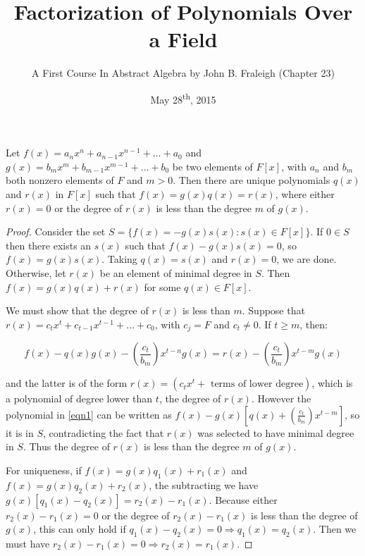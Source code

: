 \documentclass[a4paper,11pt]{article}
\title{Factorization of Polynomials Over a Field}
\author{A First Course In Abstract Algebra by John B. Fraleigh (Chapter 23)}
\date{May 28\textsuperscript{th}, 2015}
\begin{document}
\maketitle
{}

\begin{outline}

    Let \(f(x) = a_nx^n + a_{n-1}x^{n-1} + \ldots + a_0\)
    and \(g(x) = b_mx^m + b_{m-1}x^{m-1} + \ldots + b_0\) be two elements of \(F[x]\), with \(a_n\) and \(b_m\)
    both nonzero elements of \(F\) and \(m > 0\). Then there are unique polynomials \(q(x)\) and \(r(x)\) in \(F[x]\)
    such that \(f(x) = g(x)q(x) = r(x)\), where either \(r(x) = 0\) or the degree of \(r(x)\) is less than the degree
    \(m\) of \(g(x)\).
    
    \begin{proof}
      Consider the set \(S = \{f(x) =- g(x)s(x) : s(x) \in F[x]\}\). If \(0 \in S\) then there exists an \(s(x)\)
      such that \(f(x) - g(x)s(x) = 0\), so \(f(x) = g(x)s(x)\). Taking \(q(x) = s(x)\) and \(r(x) = 0\), we are done.
      Otherwise, let \(r(x)\) be an element of minimal degree in \(S\). Then \(f(x) = g(x)q(x) + r(x)\) for some \(q(x)
      \in F[x]\). 
      
      We must show that the degree of \(r(x)\) is less than \(m\). Suppose that \(r(x) = c_tx^t + c_{t-1}x^{t-1}
      + \ldots + c_0\), with \(c_j = F\) and \(c_t \neq 0\). If \(t \geq m\), then:
      
      \begin{equation}
      \label{eqn1}
      f(x) - q(x)g(x) - (\frac{c_t}{b_m})x^{t-n}g(x) = r(x) - (\frac{c_t}{b_m})x^{t-m}g(x)
      \end{equation}
      
      and the latter is of the form \(r(x) = (c_tx^t + \text{ terms of lower degree})\), which is a polynomial of degree
      lower than \(t\), the degree of \(r(x)\). However the polynomial in \eqref{eqn1} can be written as 
      \(f(x) - g(x)[q(x) + (\frac{c_t}{b_m})x^{t-m}]\), so it is in \(S\), contradicting the fact that 
      \(r(x)\) was selected to have minimal degree in \(S\). Thus the degree of \(r(x)\) is less than the degree \(m\) of
      \(g(x)\).
      
      For uniqueness, if \(f(x) = g(x)q_1(x) + r_1(x)\) and \(f(x) = g(x)q_2(x) + r_2(x)\), the subtracting we have
      \(g(x)[q_1(x)-q_2(x)] = r_2(x) - r_1(x)\). Because either \(r_2(x) - r_1(x) = 0\) or the degree of \(r_2(x) - r_1(x)\)
      is less than the degree of \(g(x)\), this can only hold if \(q_1(x) - q_2(x) = 0 \Rightarrow q_1(x) = q_2(x)\). Then
      we must have \(r_2(x) - r_1(x) = 0 \Rightarrow r_2(x) = r_1(x)\).
    \end{proof}


\end{outline}
\end{document}
